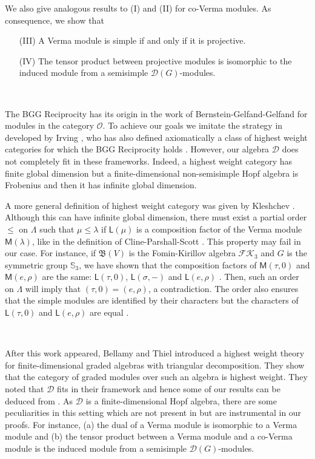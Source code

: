 \documentclass[reqno]{amsart}
\newcommand{\cO}{\mathcal{O}}
\newcommand{\FK}{\mathcal{FK}}
\newcommand{\Sn}{{\mathbb S}}
\renewcommand{\_}[1]{_{\left( #1 \right)}}
\renewcommand{\^}[1]{^{\left( #1 \right)}}
\newcommand\fL{\mathsf{L}}
\newcommand\fM{\mathsf{M}}
\newcommand{\D}{\mathcal{D}}
\newcommand{\BV}{{\mathfrak B}}
\theoremstyle{plain}
\theoremstyle{definition}
\theoremstyle{remark}
\begin{document}
We also give analogous results to (I) and (II) for co-Verma modules. As consequence, we show that

\begin{enumerate}
\item[(III)] A Verma module is simple if and only if it is projective.
\item[(IV)]  The tensor product between projective modules is isomorphic to the induced module from a semisimple $\D(G)$-modules.
\end{enumerate}



\

The BGG Reciprocity has its origin in the work of Bernstein-Gelfand-Gelfand \cite{MR0407097} for modules in the category $\cO$. To achieve our goals we imitate the strategy in \cite[Section 3]{MR2428237} developed by Irving \cite{Irving-unpublusihed}, who has also defined axiomatically  a class of highest weight categories for which the BGG Reciprocity holds \cite{MR1080852}. However, our algebra $\D$ does not completely fit in these frameworks. Indeed, a highest weight category has finite global dimension but a finite-dimensional non-semisimple Hopf algebra is Frobenius and then it has infinite global dimension.

A more general definition of highest weight category was given by Kleshchev \cite{MR3335289}. Although this can have infinite global dimension, there must exist a partial order $\leq$ on $\Lambda$ such that $\mu\leq\lambda$ if $\fL(\mu)$ is a composition factor of the Verma module $\fM(\lambda)$, like in the definition of Cline-Parshall-Scott \cite{MR961165}. This property may fail in our case. For instance, if $\BV(V)$ is the Fomin-Kirillov algebra $\FK_3$ and $G$ is the symmetric group $\Sn_3$, we have shown that the composition factors of $\fM(\tau,0)$ and $\fM(e,\rho)$ are the same: $\fL(\tau,0)$, $\fL(\sigma,-)$ and $\fL(e,\rho)$ \cite[Theorems 9 and 10]{PV2}. Then, such an order on $\Lambda$ will imply that $(\tau,0)=(e,\rho)$, a contradiction. The order also ensures that the simple modules are identified by their characters but the characters of $\fL(\tau,0)$ and $\fL(e,\rho)$ are equal \cite[Corollaries 22 and 24]{PV2}.

\

After this work appeared, Bellamy and Thiel \cite{arXiv:1705.08024} introduced a highest weight theory for finite-dimensional graded algebras with triangular decomposition. They show that 
the category of graded modules over such an algebra is highest weight. They noted that $\D$ fits in their framework and hence some of our results can be deduced from \cite{arXiv:1705.08024}. 
As $\D$ is a finite-dimensional Hopf algebra, there are some peculiarities in this setting which are not present in \cite{arXiv:1705.08024} but are instrumental in our proofs. For instance, 
(a) the dual of a Verma module is isomorphic to a Verma module and (b) the tensor product between a Verma module and a co-Verma module is the induced module from a semisimple 
$\D(G)$-modules.
\end{document}
